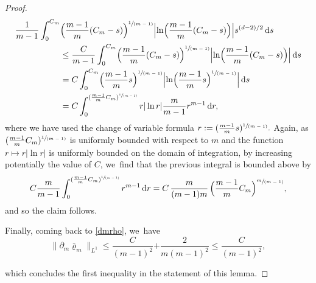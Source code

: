 \documentclass[11pt]{article}
\numberwithin{equation}{section}
\newcommand{\spfrac}[2]{\sfrac{#1}{(#2)}}
\newcommand{\prt}[1]{(#1)}
\newcommand{\Bprt}[1]{\Bigl(#1\Bigr)}
\newcommand{\dx}[1]{\mathop{}\!\mathrm{d} #1}
\theoremstyle{plain}
\theoremstyle{remark}
\begin{document}
\begin{proof}
\begin{align*}
\frac{1}{m-1}\int_0^{C_m} & \Bprt{\frac{m-1}{m}(C_m -s)}^{\spfrac{1}{m-1}} \Bigl|\ln \Bprt{\frac{m-1}{m}(C_m -s)} \Bigr| s^{(d-2)/2} \dx s\\
& \le \frac{C}{m-1}\int_0^{C_m} \Bprt{\frac{m-1}{m}(C_m -s)}^{\spfrac{1}{m-1}} \Bigl|\ln \Bprt{\frac{m-1}{m}(C_m -s)} \Bigr| \dx s\\
& = C\int_0^{C_m} \Bprt{\frac{m-1}{m}s}^{\spfrac{1}{m-1}} \Bigl|\ln \Bprt{\frac{m-1}{m}s}^{\spfrac{1}{m-1}} \Bigr| \dx s\\
& = C\int_0^{\prt{\frac{m-1}{m}C_{m}}^{\spfrac{1}{m-1}}} r |\ln r| \frac{m}{m-1} r^{m-1}\dx r,
\end{align*}
where we have used the change of variable formula $r:=\prt{\frac{m-1}{m}s}^{\spfrac{1}{m-1}}.$ Again, as $\prt{\frac{m-1}{m}C_{m}}^{\spfrac{1}{m-1}}$ is uniformly bounded with respect to $m$ and the function $r\mapsto r |\ln r|$ is uniformly bounded on the domain of integration, by increasing potentially the value of $C$, we~find that the previous integral is bounded above by
\begin{align*}
C\frac{m}{m-1} \int_0^{\prt{\frac{m-1}{m}C_{m}}^{\spfrac{1}{m-1}}} r^{m-1}\dx r = C\,\frac{m}{(m-1)m}\, \Bprt{\frac{m-1}{m}C_{m}}^{\spfrac{m}{m-1}},
\end{align*}
and so the claim follows.

Finally, coming back to \eqref{dmrho}, we~have
\begin{equation}\label{rate l1}
\|\partial_m \bar\varrho_m\|_{L^1}\leq \frac{C}{(m-1)^2}{+ \frac{2}{m(m-1)^2} \leq \frac{C}{(m-1)^2}},
\end{equation}
{ which concludes the first inequality in the statement of this lemma.

}
\end{proof}
\end{document}
